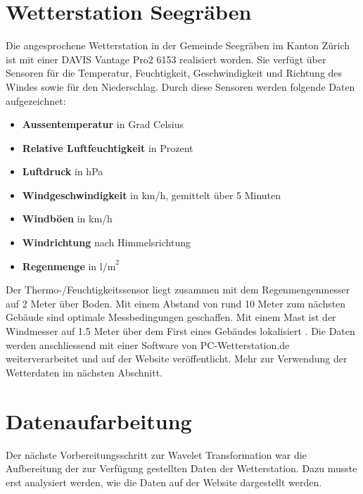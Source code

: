 \begin{refsection}
\section{Wetterstation Seegräben}
%
%

Die angesprochene Wetterstation in der Gemeinde Seegräben im Kanton Zürich ist mit einer DAVIS Vantage Pro2 6153 \cite{online:davisinstruments} realisiert worden.
%
Sie verfügt über Sensoren für die Temperatur, Feuchtigkeit, Geschwindigkeit und Richtung des Windes sowie für den Niederschlag. 
Durch diese Sensoren werden folgende Daten aufgezeichnet:


\begin{itemize}
	\item \textbf{Aussentemperatur} in Grad Celsius
	\item \textbf{Relative Luftfeuchtigkeit} in Prozent
	\item \textbf{Luftdruck} in hPa
	\item \textbf{Windgeschwindigkeit} in km/h, gemittelt über 5 Minuten
	\item \textbf{Windböen} in km/h
	\item \textbf{Windrichtung} nach Himmelsrichtung
	\item \textbf{Regenmenge} in $\text{l/m}^{2}$
\end{itemize}	


Der Thermo-/Feuchtigkeitssensor liegt zusammen mit dem Regenmengenmesser auf 2 Meter über Boden.
Mit einem Abstand von rund 10 Meter zum nächsten Gebäude sind optimale Messbedingungen geschaffen.
Mit einem Mast ist der Windmesser auf 1.5 Meter über dem First eines Gebäudes lokalisiert \space \cite{online:wss}.
Die Daten werden anschliessend mit einer Software von PC-Wetterstation.de weiterverarbeitet und auf der Website \cite{online:wss} veröffentlicht.
Mehr zur Verwendung der Wetterdaten im n\"achsten Abschnitt.

\section{Datenaufarbeitung}
Der n\"achste Vorbereitungsschritt zur Wavelet Transformation war die Aufbereitung der zur Verf\"ugung gestellten Daten der Wetterstation. Dazu musste erst analysiert werden, wie die Daten auf der Website dargestellt werden.

\end{refsection}
